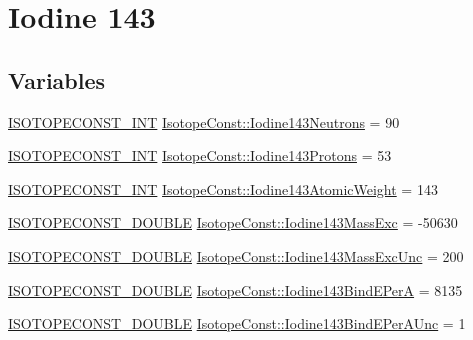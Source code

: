 \hypertarget{group___isotope_const-_iodine-_i143}{}\section{Iodine 143}
\label{group___isotope_const-_iodine-_i143}
\subsection*{Variables}
\begin{DoxyCompactItemize}
\item 
\mbox{\hyperlink{group___isotope_const-_macros_ga5f18360b3e99483a35c32d789e62621c}{I\+S\+O\+T\+O\+P\+E\+C\+O\+N\+S\+T\+\_\+\+I\+NT}} \mbox{\hyperlink{group___isotope_const-_iodine-_i143_gaedf8064f888dabd589dab3fd32499357}{Isotope\+Const\+::\+Iodine143\+Neutrons}} = 90
\item 
\mbox{\hyperlink{group___isotope_const-_macros_ga5f18360b3e99483a35c32d789e62621c}{I\+S\+O\+T\+O\+P\+E\+C\+O\+N\+S\+T\+\_\+\+I\+NT}} \mbox{\hyperlink{group___isotope_const-_iodine-_i143_ga991c162073a5afad398a3de02689fa04}{Isotope\+Const\+::\+Iodine143\+Protons}} = 53
\item 
\mbox{\hyperlink{group___isotope_const-_macros_ga5f18360b3e99483a35c32d789e62621c}{I\+S\+O\+T\+O\+P\+E\+C\+O\+N\+S\+T\+\_\+\+I\+NT}} \mbox{\hyperlink{group___isotope_const-_iodine-_i143_ga991ff8a83be666ace8e998036f409819}{Isotope\+Const\+::\+Iodine143\+Atomic\+Weight}} = 143
\item 
\mbox{\hyperlink{group___isotope_const-_macros_ga8f45a7272ce02c0b4c65c44636ed719a}{I\+S\+O\+T\+O\+P\+E\+C\+O\+N\+S\+T\+\_\+\+D\+O\+U\+B\+LE}} \mbox{\hyperlink{group___isotope_const-_iodine-_i143_gab0eb3aa0450f5db68d636fcde1666d04}{Isotope\+Const\+::\+Iodine143\+Mass\+Exc}} = -\/50630
\item 
\mbox{\hyperlink{group___isotope_const-_macros_ga8f45a7272ce02c0b4c65c44636ed719a}{I\+S\+O\+T\+O\+P\+E\+C\+O\+N\+S\+T\+\_\+\+D\+O\+U\+B\+LE}} \mbox{\hyperlink{group___isotope_const-_iodine-_i143_gaae5f3f2be9e9cc6a2684ff46e3424ec2}{Isotope\+Const\+::\+Iodine143\+Mass\+Exc\+Unc}} = 200
\item 
\mbox{\hyperlink{group___isotope_const-_macros_ga8f45a7272ce02c0b4c65c44636ed719a}{I\+S\+O\+T\+O\+P\+E\+C\+O\+N\+S\+T\+\_\+\+D\+O\+U\+B\+LE}} \mbox{\hyperlink{group___isotope_const-_iodine-_i143_ga57858d1ec7d61077ab91788b57db1b89}{Isotope\+Const\+::\+Iodine143\+Bind\+E\+PerA}} = 8135
\item 
\mbox{\hyperlink{group___isotope_const-_macros_ga8f45a7272ce02c0b4c65c44636ed719a}{I\+S\+O\+T\+O\+P\+E\+C\+O\+N\+S\+T\+\_\+\+D\+O\+U\+B\+LE}} \mbox{\hyperlink{group___isotope_const-_iodine-_i143_ga96e62f1d8375165779cd8d5e5ac00c98}{Isotope\+Const\+::\+Iodine143\+Bind\+E\+Per\+A\+Unc}} = 1

\end{DoxyCompactItemize}
